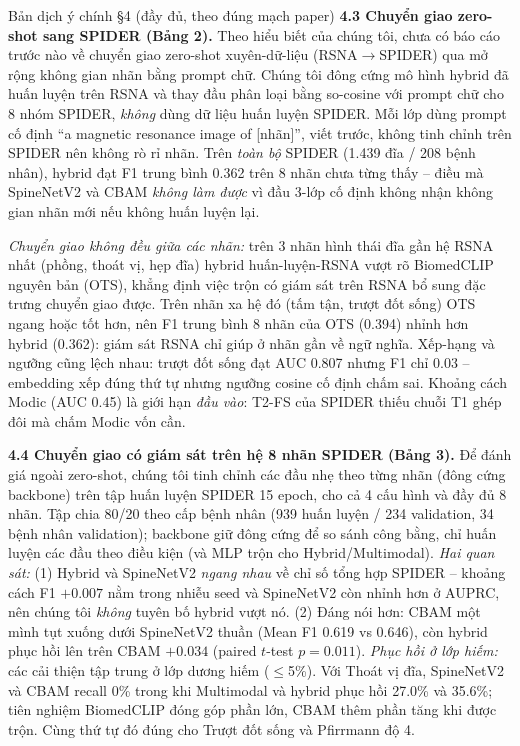 \documentclass[12pt,a4paper]{article}
\begin{document}
\begin{dichbox}{Bản dịch ý chính §4 (đầy đủ, theo đúng mạch paper)}
\textbf{4.3 Chuyển giao zero-shot sang SPIDER (Bảng 2).}
Theo hiểu biết của chúng tôi, chưa có báo cáo trước nào về chuyển giao zero-shot xuyên-dữ-liệu (RSNA$\to$SPIDER) qua mở rộng không gian nhãn bằng prompt chữ. Chúng tôi đông cứng mô hình hybrid đã huấn luyện trên RSNA và thay đầu phân loại bằng so-cosine với prompt chữ cho 8 nhóm SPIDER, \emph{không} dùng dữ liệu huấn luyện SPIDER. Mỗi lớp dùng prompt cố định ``a magnetic resonance image of [nhãn]'', viết trước, không tinh chỉnh trên SPIDER nên không rò rỉ nhãn. Trên \emph{toàn bộ} SPIDER (1.439 đĩa / 208 bệnh nhân), hybrid đạt F1 trung bình 0.362 trên 8 nhãn chưa từng thấy -- điều mà SpineNetV2 và CBAM \emph{không làm được} vì đầu 3-lớp cố định không nhận không gian nhãn mới nếu không huấn luyện lại.

\emph{Chuyển giao không đều giữa các nhãn:} trên 3 nhãn hình thái đĩa gần hệ RSNA nhất (phồng, thoát vị, hẹp đĩa) hybrid huấn-luyện-RSNA vượt rõ BiomedCLIP nguyên bản (OTS), khẳng định việc trộn có giám sát trên RSNA bổ sung đặc trưng chuyển giao được. Trên nhãn xa hệ đó (tấm tận, trượt đốt sống) OTS ngang hoặc tốt hơn, nên F1 trung bình 8 nhãn của OTS (0.394) nhỉnh hơn hybrid (0.362): giám sát RSNA chỉ giúp ở nhãn gần về ngữ nghĩa. Xếp-hạng và ngưỡng cũng lệch nhau: trượt đốt sống đạt AUC 0.807 nhưng F1 chỉ 0.03 -- embedding xếp đúng thứ tự nhưng ngưỡng cosine cố định chấm sai. Khoảng cách Modic (AUC 0.45) là giới hạn \emph{đầu vào}: T2-FS của SPIDER thiếu chuỗi T1 ghép đôi mà chấm Modic vốn cần.

\textbf{4.4 Chuyển giao có giám sát trên hệ 8 nhãn SPIDER (Bảng 3).}
Để đánh giá ngoài zero-shot, chúng tôi tinh chỉnh các đầu nhẹ theo từng nhãn (đông cứng backbone) trên tập huấn luyện SPIDER 15 epoch, cho cả 4 cấu hình và đầy đủ 8 nhãn. Tập chia 80/20 theo cấp bệnh nhân (939 huấn luyện / 234 validation, 34 bệnh nhân validation); backbone giữ đông cứng để so sánh công bằng, chỉ huấn luyện các đầu theo điều kiện (và MLP trộn cho Hybrid/Multimodal). \emph{Hai quan sát:} (1) Hybrid và SpineNetV2 \emph{ngang nhau} về chỉ số tổng hợp SPIDER -- khoảng cách F1 $+0.007$ nằm trong nhiễu seed và SpineNetV2 còn nhỉnh hơn ở AUPRC, nên chúng tôi \emph{không} tuyên bố hybrid vượt nó. (2) Đáng nói hơn: CBAM một mình tụt xuống dưới SpineNetV2 thuần (Mean F1 0.619 vs 0.646), còn hybrid phục hồi lên trên CBAM $+0.034$ (paired $t$-test $p=0.011$). \emph{Phục hồi ở lớp hiếm:} các cải thiện tập trung ở lớp dương hiếm ($\leq$5\%). Với Thoát vị đĩa, SpineNetV2 và CBAM recall 0\% trong khi Multimodal và hybrid phục hồi 27.0\% và 35.6\%; tiên nghiệm BiomedCLIP đóng góp phần lớn, CBAM thêm phần tăng khi được trộn. Cùng thứ tự đó đúng cho Trượt đốt sống và Pfirrmann độ 4.


\end{dichbox}
\end{document}
